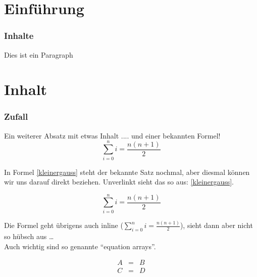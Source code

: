 \part{Einf\"uhrung}

\section{Inhalte}

Dies ist ein Paragraph

\newpage

\part{Inhalt}

\section{Zufall}

Ein weiterer Absatz mit etwas Inhalt .... und einer bekannten Formel!
\begin{displaymath}
\sum_{i=0}^{n} i = \frac{n(n+1)}{2}
\end{displaymath}

In Formel \ref{kleinergauss} steht der bekannte Satz nochmal, aber diesmal k\"onnen wir uns darauf direkt beziehen. Unverlinkt sieht das so aus: \ref*{kleinergauss}. 

\begin{equation}
\label{kleinergauss}
\sum_{i=0}^{n} i = \frac{n(n+1)}{2}
\end{equation}

Die Formel geht \"ubrigens auch inline ($\sum_{i=0}^{n} i = \frac{n(n+1)}{2}$), sieht dann aber nicht so h\"ubsch aus \ldots \\
Auch wichtig sind so genannte ``equation arrays''.

\begin{eqnarray}
A & = & B \\
C & = & D 
\end{eqnarray}